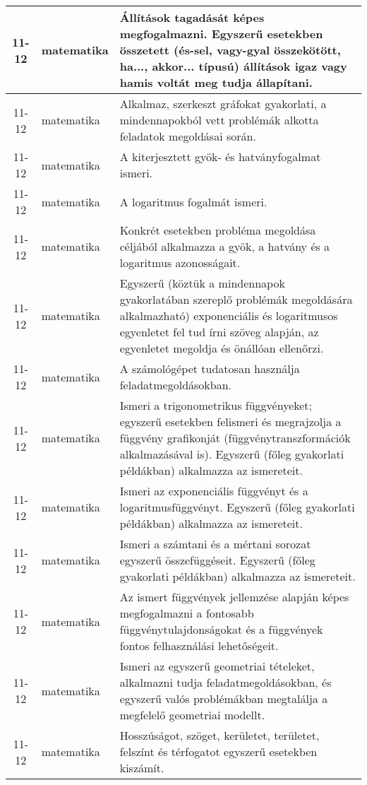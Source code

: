 \begin{small}
\begin{longtable}{c | p{2cm} |  p{11cm} }
              11-12 & matematika & Állítások tagadását képes megfogalmazni. Egyszerű esetekben összetett (és-sel, vagy-gyal összekötött, ha..., akkor... típusú) állítások igaz vagy hamis voltát meg tudja állapítani. \\ \hline
              11-12 & matematika & Alkalmaz, szerkeszt gráfokat gyakorlati, a mindennapokból vett problémák alkotta feladatok megoldásai során. \\ \hline
              11-12 & matematika & A kiterjesztett gyök- és hatványfogalmat ismeri. \\ \hline
              11-12 & matematika & A logaritmus fogalmát ismeri. \\ \hline
              11-12 & matematika & Konkrét esetekben probléma megoldása céljából  alkalmazza a gyök, a hatvány és a logaritmus azonosságait. \\ \hline
              11-12 & matematika & Egyszerű (köztük a mindennapok gyakorlatában szereplő problémák megoldására alkalmazható) exponenciális és logaritmusos egyenletet fel tud írni szöveg alapján, az egyenletet megoldja és önállóan ellenőrzi. \\ \hline
              11-12 & matematika & A számológépet tudatosan használja feladatmegoldásokban. \\ \hline
              11-12 & matematika & Ismeri a trigonometrikus függvényeket; egyszerű esetekben felismeri és megrajzolja a függvény grafikonját (függvénytranszformációk alkalmazásával is). Egyszerű (főleg gyakorlati példákban) alkalmazza az ismereteit. \\ \hline
              11-12 & matematika & Ismeri az exponenciális függvényt és a logaritmusfüggvényt. Egyszerű (főleg gyakorlati példákban) alkalmazza az ismereteit. \\ \hline
              11-12 & matematika & Ismeri a számtani és a mértani sorozat egyszerű összefüggéseit. Egyszerű (főleg gyakorlati példákban) alkalmazza az ismereteit. \\ \hline
              11-12 & matematika & Az ismert függvények jellemzése alapján képes megfogalmazni a fontosabb függvénytulajdonságokat és a függvények fontos felhasználási lehetőségeit. \\ \hline
              11-12 & matematika & Ismeri az egyszerű geometriai tételeket, alkalmazni tudja feladatmegoldásokban, és egyszerű valós problémákban megtalálja a megfelelő geometriai modellt. \\ \hline
              11-12 & matematika & Hosszúságot, szöget, kerületet, területet, felszínt és térfogatot egyszerű esetekben kiszámít. \\ \hline

\end{longtable}
\end{small}
